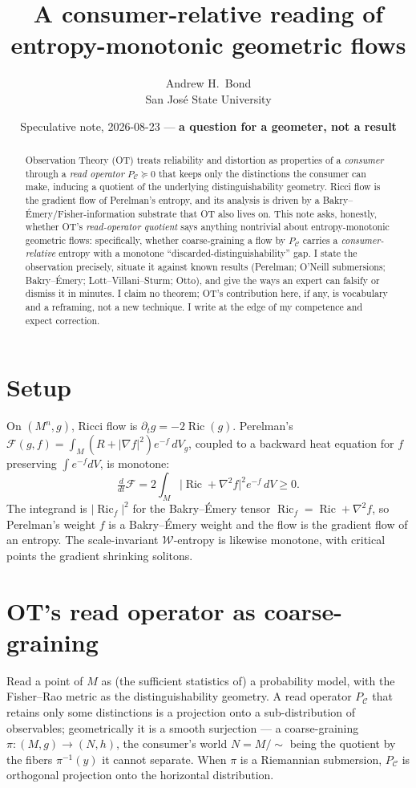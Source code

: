 \documentclass[11pt]{article}
\title{A consumer-relative reading of entropy-monotonic geometric flows}
\author{Andrew H.\ Bond \\ \small San Jos\'e State University}
\date{Speculative note, 2026-08-23 --- \textbf{a question for a geometer, not a result}}
\newcommand{\Ric}{\operatorname{Ric}}
\newcommand{\PC}{P_{\mathcal C}}
\begin{document}
\maketitle

\begin{abstract}
Observation Theory (OT) treats reliability and distortion as properties of a
\emph{consumer} through a \emph{read operator} $\PC\succeq0$ that keeps only the
distinctions the consumer can make, inducing a quotient of the underlying
distinguishability geometry. Ricci flow is the gradient flow of Perelman's
entropy, and its analysis is driven by a Bakry--\'Emery/Fisher-information
substrate that OT also lives on. This note asks, honestly, whether OT's
\emph{read-operator quotient} says anything nontrivial about entropy-monotonic
geometric flows: specifically, whether coarse-graining a flow by $\PC$ carries a
\emph{consumer-relative} entropy with a monotone ``discarded-distinguishability''
gap. I state the observation precisely, situate it against known results
(Perelman; O'Neill submersions; Bakry--\'Emery; Lott--Villani--Sturm; Otto), and
give the ways an expert can falsify or dismiss it in minutes. I claim no theorem;
OT's contribution here, if any, is vocabulary and a reframing, not a new
technique. I write at the edge of my competence and expect correction.
\end{abstract}

\section{Setup}
On $(M^n,g)$, Ricci flow is $\partial_t g=-2\Ric(g)$. Perelman's
$\mathcal F(g,f)=\int_M(R+|\nabla f|^2)e^{-f}\,dV_g$, coupled to a backward heat
equation for $f$ preserving $\int e^{-f}dV$, is monotone:
\[
\tfrac{d}{dt}\mathcal F = 2\int_M \big|\Ric+\nabla^2 f\big|^2 e^{-f}\,dV \ge 0 .
\]
The integrand is $|\Ric_f|^2$ for the Bakry--\'Emery tensor
$\Ric_f=\Ric+\nabla^2 f$, so Perelman's weight $f$ is a Bakry--\'Emery weight and
the flow is the gradient flow of an entropy. The scale-invariant
$\mathcal W$-entropy is likewise monotone, with critical points the gradient
shrinking solitons.

\section{OT's read operator as coarse-graining}
Read a point of $M$ as (the sufficient statistics of) a probability model, with
the Fisher--Rao metric as the distinguishability geometry. A read operator $\PC$
that retains only some distinctions is a projection onto a sub-distribution of
observables; geometrically it is a smooth surjection --- a coarse-graining
$\pi:(M,g)\to(N,h)$, the consumer's world $N=M/\!\sim$ being the quotient by the
fibers $\pi^{-1}(y)$ it cannot separate. When $\pi$ is a Riemannian submersion,
$\PC$ is orthogonal projection onto the horizontal distribution.
\end{document}
